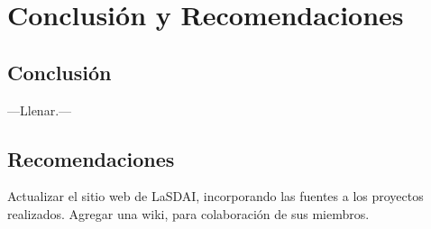 \chapter{Conclusión y Recomendaciones}

\section{Conclusión}

---Llenar.---

\section{Recomendaciones}

Actualizar el sitio web de LaSDAI, incorporando las fuentes a los proyectos realizados.
Agregar una wiki, para colaboración de sus miembros.
